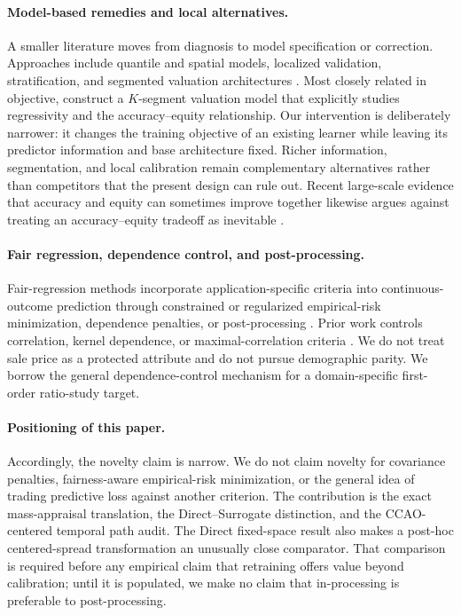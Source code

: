 \documentclass[10pt]{article}
\theoremstyle{definition}
\newcommand{\1}{\mathbf{1}}
\begin{document}
\paragraph{Model-based remedies and local alternatives.}
A smaller literature moves from diagnosis to model specification or correction. Approaches include quantile and spatial models, localized validation, stratification, and segmented valuation architectures \cite{Quintos2014,BidansetEtAl2019,BidansetEtAl2025,HermansEtAl2022,HermansEtAl2025,CandoganHanLu2023}. Most closely related in objective, \textcite{CandoganHanLu2023} construct a $K$-segment valuation model that explicitly studies regressivity and the accuracy--equity relationship. Our intervention is deliberately narrower: it changes the training objective of an existing learner while leaving its predictor information and base architecture fixed. Richer information, segmentation, and local calibration remain complementary alternatives rather than competitors that the present design can rule out. Recent large-scale evidence that accuracy and equity can sometimes improve together likewise argues against treating an accuracy--equity tradeoff as inevitable \cite{SmithEtAl2026}.

\paragraph{Fair regression, dependence control, and post-processing.}
Fair-regression methods incorporate application-specific criteria into continuous-outcome prediction through constrained or regularized empirical-risk minimization, dependence penalties, or post-processing \cite{AgarwalDudikWu2019,FitzsimonsEtAl2019,ChzhenEtAl2020Wasserstein,ChzhenEtAl2020Recalibration,WeiEtAl2023}. Prior work controls correlation, kernel dependence, or maximal-correlation criteria \cite{KomiyamaEtAl2018,PerezSuayEtAl2017,LiEtAl2022Fairness,MaryEtAl2019,lee2022maximal,ScutariPaneroProissl2022}. We do not treat sale price as a protected attribute and do not pursue demographic parity. We borrow the general dependence-control mechanism for a domain-specific first-order ratio-study target.

\paragraph{Positioning of this paper.}
Accordingly, the novelty claim is narrow. We do not claim novelty for covariance penalties, fairness-aware empirical-risk minimization, or the general idea of trading predictive loss against another criterion. The contribution is the exact mass-appraisal translation, the Direct--Surrogate distinction, and the CCAO-centered temporal path audit. The Direct fixed-space result also makes a post-hoc centered-spread transformation an unusually close comparator. That comparison is required before any empirical claim that retraining offers value beyond calibration; until it is populated, we make no claim that in-processing is preferable to post-processing.
\end{document}
